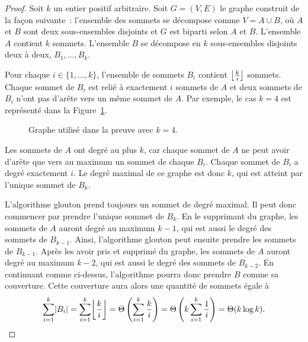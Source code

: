 \documentclass[a4paper,11pt]{amsart}
\theoremstyle{plain}
\DeclarePairedDelimiter{\floor}{\lfloor}{\rfloor}
\DeclarePairedDelimiter{\abs}{\lvert}{\rvert}
\begin{document}
\begin{proof}
Soit $k$ un entier positif arbitraire. Soit $G = (V, E)$ le graphe cons\-truit de la façon suivante~: l'ensemble des sommets se décompose comme $V = A \cup B$, où $A$ et $B$ sont deux sous-ensembles disjoints et $G$ est biparti selon $A$ et $B$. L'ensemble $A$ contient $k$ sommets. L'ensemble $B$ se décompose en $k$ sous-ensembles disjoints deux à deux, $B_1, \dotsc, B_k$.

Pour chaque $i \in \{1, \dotsc, k\}$, l'ensemble de sommets $B_i$ contient $\floor*{\frac{k}{i}}$ sommets. Chaque sommet de $B_i$ est relié à exactement $i$ sommets de $A$ et deux sommets de $B_i$ n'ont pas d'arête vers un même sommet de $A$. Par exemple, le cas $k = 4$ est représenté dans la Figure~\ref{GrapheContreExempleGlouton}.

\begin{figure}[ht]
\centering

\caption{Graphe utilisé dans la preuve avec $k = 4$.}
\label{GrapheContreExempleGlouton}
\end{figure}

Les sommets de $A$ ont degré au plus $k$, car chaque sommet de $A$ ne peut avoir d'arête que vers au maximum un sommet de chaque $B_i$. Chaque sommet de $B_i$ a degré exactement $i$. Le degré maximal de ce graphe est donc $k$, qui est atteint par l'unique sommet de $B_k$.

L'algorithme glouton prend toujours un sommet de degré maximal. Il peut donc commencer par prendre l'unique sommet de $B_k$. En le supprimant du gra\-phe, les sommets de $A$ auront degré au maximum $k-1$, qui est aussi le degré des sommets de $B_{k-1}$. Ainsi, l'algorithme glouton peut ensuite prendre les sommets de $B_{k-1}$. Après les avoir pris et supprimé du graphe, les sommets de $A$ auront degré au maximum $k-2$, qui est aussi le degré des sommets de $B_{k-2}$. En continuant comme ci-dessus, l'algorithme pourra donc prendre $B$ comme sa couverture. Cette couverture aura alors une quantité de sommets égale à
\[\sum_{i=1}^k \abs*{B_i} = \sum_{i=1}^k \floor*{\frac{k}{i}} = \Theta\left(\sum_{i=1}^k \frac{k}{i}\right) = \Theta\left(k \sum_{i=1}^k \frac{1}{i}\right) = \Theta(k \log k).\]


\end{proof}
\end{document}
